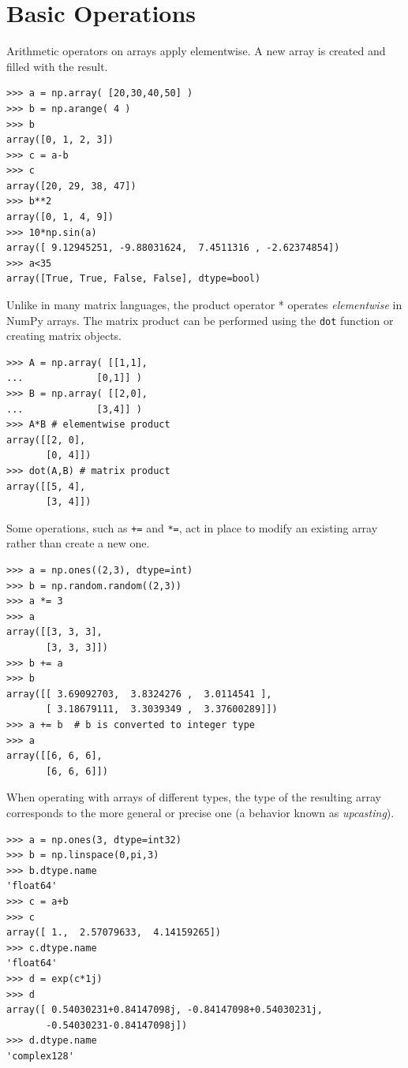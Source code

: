 \documentclass[12pt]{article}
\begin{document}
\section{Basic Operations}
Arithmetic operators on arrays apply elementwise. A new array is created and filled with the result.
\footnotesize
\begin{Verbatim}[frame=single]
>>> a = np.array( [20,30,40,50] )
>>> b = np.arange( 4 )
>>> b
array([0, 1, 2, 3])
>>> c = a-b
>>> c
array([20, 29, 38, 47])
>>> b**2
array([0, 1, 4, 9])
>>> 10*np.sin(a)
array([ 9.12945251, -9.88031624,  7.4511316 , -2.62374854])
>>> a<35
array([True, True, False, False], dtype=bool)
\end{Verbatim}
\normalsize
Unlike in many matrix languages, the product operator * operates \textit{elementwise} in NumPy arrays. The matrix product can be performed using the \texttt{dot} function or creating matrix objects.
\footnotesize
\begin{Verbatim}[frame=single]
>>> A = np.array( [[1,1],
...             [0,1]] )
>>> B = np.array( [[2,0],
...             [3,4]] )
>>> A*B # elementwise product
array([[2, 0],
       [0, 4]])
>>> dot(A,B) # matrix product
array([[5, 4],
       [3, 4]])
 \end{Verbatim}
\normalsize
      
Some operations, such as \texttt{+=} and \texttt{*=}, act in place to modify an existing array rather than create a new one.
\footnotesize
\begin{Verbatim}[frame=single]
>>> a = np.ones((2,3), dtype=int)
>>> b = np.random.random((2,3))
>>> a *= 3
>>> a
array([[3, 3, 3],
       [3, 3, 3]])
>>> b += a
>>> b
array([[ 3.69092703,  3.8324276 ,  3.0114541 ],
       [ 3.18679111,  3.3039349 ,  3.37600289]])
>>> a += b  # b is converted to integer type
>>> a
array([[6, 6, 6],
       [6, 6, 6]])
\end{Verbatim}
\normalsize

When operating with arrays of different types, the type of the resulting array corresponds to the more general or precise one (a behavior known as \textit{upcasting}).
\footnotesize
\begin{Verbatim}[frame=single]
>>> a = np.ones(3, dtype=int32)
>>> b = np.linspace(0,pi,3)
>>> b.dtype.name
'float64'
>>> c = a+b
>>> c
array([ 1.,  2.57079633,  4.14159265])
>>> c.dtype.name
'float64'
>>> d = exp(c*1j)
>>> d
array([ 0.54030231+0.84147098j, -0.84147098+0.54030231j,
       -0.54030231-0.84147098j])
>>> d.dtype.name
'complex128'
\end{Verbatim}
\normalsize
\end{document}
